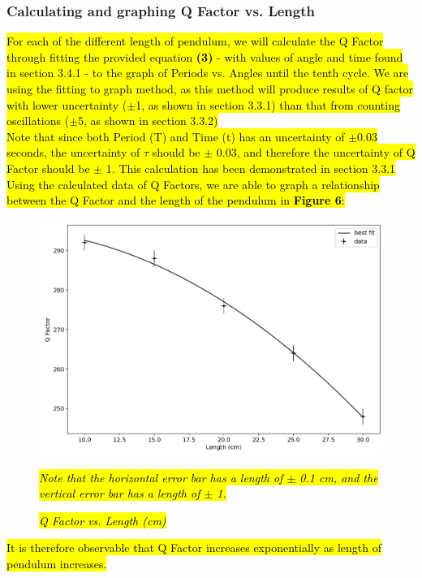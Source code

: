 \documentclass{article}
\begin{document}
\subsubsection{Calculating and graphing Q Factor vs. Length}
\hl{For each of the different length of pendulum, we will calculate the Q Factor through fitting the provided equation \textbf{(3)} - with values of angle and time found in section 3.4.1 - to the graph of Periods vs. Angles until the tenth cycle. We are using the fitting to graph method, as this method will produce results of Q factor with lower uncertainty ($\pm$1, as shown in section 3.3.1) than that from counting oscillations ($\pm$5, as shown in section 3.3.2)\\}
\indent \hl{Note that since both Period (T) and Time (t) has an uncertainty of $\pm$0.03 seconds, the uncertainty of $\tau$ should be $\pm$ 0.03, and therefore the uncertainty of Q Factor should be $\pm$ 1. This calculation has been demonstrated in section 3.3.1 \\}
\indent \hl{Using the calculated data of Q Factors, we are able to graph a relationship between the Q Factor and the length of the pendulum in \textbf{Figure 6}:}

\begin{figure}[!htb]
	\includegraphics[scale=0.3]{Q_Factor_Length.png}
	\caption{\textit{\hl{Q Factor vs. Length (cm)}}}
	\center \textit{\hl{Note that the horizontal error bar has a length of $\pm$ 0.1 cm, and the vertical error bar has a length of $\pm$ 1. }}
	\label{length}
	
\end{figure}
\hl{It is therefore observable that Q Factor increases exponentially as length of pendulum increases.}
\end{document}
